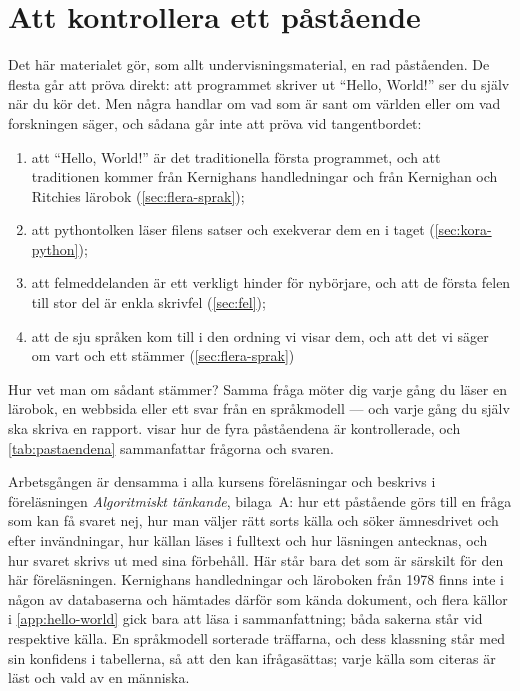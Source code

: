\chapter{Att kontrollera ett påstående}
\label{app:verifiera-hello}

Det här materialet gör, som allt undervisningsmaterial, en rad påståenden.
De flesta går att pröva direkt: att programmet skriver ut \enquote{Hello,
World!} ser du själv när du kör det.  Men några handlar om vad som är
sant om världen eller om vad forskningen säger, och sådana går inte att
pröva vid tangentbordet:
\begin{enumerate}
  \item att \enquote{Hello, World!} är det traditionella första
    programmet, och att traditionen kommer från Kernighans handledningar
    och från Kernighan och Ritchies lärobok (\cref{sec:flera-sprak});
  \item att pythontolken läser filens satser och exekverar dem en i
    taget (\cref{sec:kora-python});
  \item att felmeddelanden är ett verkligt hinder för nybörjare, och att
    de första felen till stor del är enkla skrivfel (\cref{sec:fel});
  \item att de sju språken kom till i den ordning vi visar dem, och att
    det vi säger om vart och ett stämmer
    (\cref{sec:flera-sprak})%
\end{enumerate}
Hur vet man om sådant stämmer?  Samma fråga möter dig varje gång du läser
en lärobok, en webbsida eller ett svar från en språkmodell --- och varje
gång du själv ska skriva en rapport.
visar hur de fyra påståendena är kontrollerade,
och \cref{tab:pastaendena} sammanfattar frågorna och svaren.%

Arbetsgången är densamma i alla kursens föreläsningar och beskrivs i
föreläsningen \emph{Algoritmiskt tänkande}, bilaga~A: hur ett påstående
görs till en fråga som kan få svaret nej, hur man väljer rätt sorts
källa och söker ämnesdrivet och efter invändningar, hur källan läses i
fulltext och hur läsningen antecknas, och hur svaret skrivs ut med sina
förbehåll.  Här står bara det som är särskilt för den här föreläsningen.
Kernighans handledningar och läroboken från 1978 finns inte i någon av
databaserna och hämtades därför som kända dokument, och flera källor i
\cref{app:hello-world} gick bara att läsa i sammanfattning; båda sakerna
står vid respektive källa.  En språkmodell sorterade träffarna, och
dess klassning står med sin konfidens i tabellerna, så att den kan
ifrågasättas; varje källa som citeras är läst och vald av en människa.

